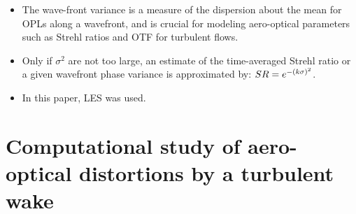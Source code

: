 \begin{itemize}
            \item The wave-front variance is a measure of the dispersion about the mean for OPLs along a wavefront, and is crucial for modeling aero-optical parameters such as Strehl ratios and OTF for turbulent flows. 
            \item Only if $\sigma^2$ are not too large, an estimate of the time-averaged Strehl ratio or a given wavefront phase variance is approximated by: $ SR = e^{-\left(k\sigma\right)^2} $. 
            \item In this paper, LES was used. 
        \end{itemize}


    \section{Computational study of aero-optical distortions by a turbulent wake \cite{mani:aiaa:2005}}
